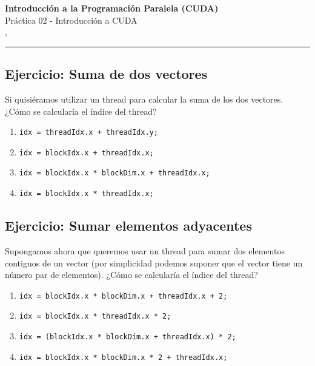 



\begin{center}
  \LARGE\textbf{Introducción a la Programación Paralela (CUDA)} \\
  \Large{Práctica 02 - Introducción a CUDA} \\
  \normalsize{\currentsemester, \currentyear} \\
  \vspace{1em}
  \hrule
\end{center}

\setcounter{section}{2}



\newpage

\tableofcontents

\newpage

\subsection{Ejercicio: Suma de dos vectores}

Si quisiéramos utilizar un thread para calcular la suma de los dos vectores. ¿Cómo se calcularía el índice del thread?

\begin{enumerate}[label=\roman*.]
  \item \texttt{idx = threadIdx.x + threadIdx.y;}
  \item \texttt{idx = blockIdx.x + threadIdx.x;}
  \item \texttt{idx = blockIdx.x * blockDim.x + threadIdx.x;}
  \item \texttt{idx = blockIdx.x * threadIdx.x;}
\end{enumerate}

\subsection{Ejercicio: Sumar elementos adyacentes}

Supongamos ahora que queremos usar un thread para sumar dos elementos contiguos de un vector (por simplicidad podemos
suponer que el vector tiene un número par de elementos). ¿Cómo se calcularía el índice del thread?

\begin{enumerate}[label=\roman*.]
  \item \texttt{idx = blockIdx.x * blockDim.x + threadIdx.x + 2;}
  \item \texttt{idx = blockIdx.x * threadIdx.x * 2;}
  \item \texttt{idx = (blockIdx.x * blockDim.x + threadIdx.x) * 2;}
  \item \texttt{idx = blockIdx.x * blockDim.x * 2 + threadIdx.x;}
\end{enumerate}

